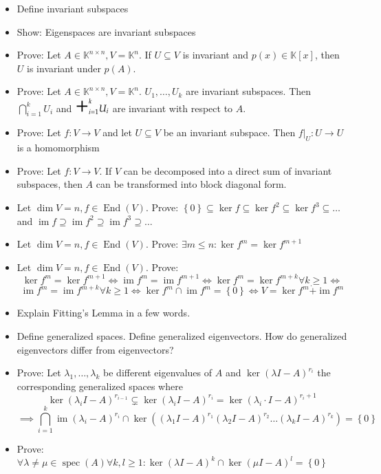 \documentclass[a4paper]{article}
\newcommand{\set}[1]{\left\{#1\right\}}
\DeclareMathOperator{\im}{im}
\begin{document}
\begin{itemize}
  \item Define invariant subspaces
  \item Show: Eigenspaces are invariant subspaces
  \item Prove: Let $A \in \mathbb K^{n\times n}, V = \mathbb K^n$. If $U \subseteq V$ is invariant and $p(x) \in \mathbb K[x]$, then $U$ is invariant under $p(A)$.
  \item Prove: Let $A \in \mathbb K^{n\times n}, V = \mathbb K^n$. $U_1, \dots, U_k$ are invariant subspaces. Then $\bigcap_{i=1}^k U_i$ and ${\text{\huge +}}_{i=1}^k U_i$ are invariant with respect to $A$.
  \item Prove: Let $f: V \to V$ and let $U \subseteq V$ be an invariant subspace. Then $f|_U: U \to U$ is a homomorphism
  \item Prove: Let $f: V \to V$. If $V$ can be decomposed into a direct sum of invariant subspaces, then $A$ can be transformed into block diagonal form.
  \item Let $\dim{V} = n, f \in \operatorname{End}(V)$. Prove: $\set{0} \subseteq \ker{f} \subseteq \ker{f^2} \subseteq \ker{f^3} \subseteq \dots$ and $\im{f} \supseteq \im{f^2} \supseteq \im{f^3} \supseteq \dots$
  \item Let $\dim{V} = n, f \in \operatorname{End}(V)$. Prove: $\exists m \leq n: \ker{f^m} = \ker{f^{m+1}}$
  \item Let $\dim{V} = n, f \in \operatorname{End}(V)$. Prove:
    \[ \ker{f^m} = \ker{f^{m+1}} \iff \im{f^m} = \im{f^{m+1}} \iff \ker{f^m} = \ker{f^{m+k}} \forall k \geq 1 \iff \]
    \[ \im{f^m} = \im{f^{m+k}} \forall k \geq 1 \iff \ker{f^m} \cap \im{f^m} = \set{0} \iff V = \ker{f^m} \dot{+} \im{f^m} \]
  \item Explain Fitting's Lemma in a few words.
  \item Define generalized spaces. Define generalized eigenvectors. How do generalized eigenvectors differ from eigenvectors?
  \item Prove: Let $\lambda_1, \dots, \lambda_k$ be different eigenvalues of $A$ and $\ker(\lambda I - A)^{r_i}$ the corresponding generalized spaces where
    \[ \ker(\lambda_i I - A)^{r_{i-1}} \subsetneq \ker(\lambda_i I - A)^{r_i} = \ker(\lambda_i \cdot I - A)^{r_i + 1} \]
    \[ \implies \bigcap_{i=1}^k \im(\lambda_i - A)^{r_i} \cap \ker((\lambda_1 I - A)^{r_1} (\lambda_2 I - A)^{r_2} \dots (\lambda_k I - A)^{r_k}) = \set{0} \]
  \item Prove: $\forall \lambda \neq \mu \in \operatorname{spec}(A) \forall k,l \geq 1: \ker(\lambda I - A)^k \cap \ker(\mu I - A)^l = \set{0}$

\end{itemize}
\end{document}
